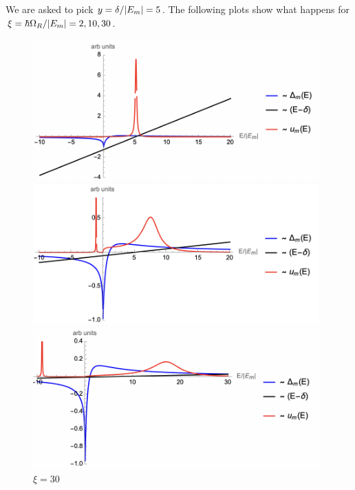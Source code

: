 \documentclass{article}
\theoremstyle{definition}
\begin{document}
\begin{enumerate}[label=(\alph*)]
We are asked to pick $y = \delta / \abs{E_m} = 5$. The following plots show what happens for $\xi = \hbar \Omega_R / \abs{E_m} = 2, 10, 30$. 

\begin{figure}[!htb]
\centering
\begin{minipage}{0.32\textwidth}
\includegraphics[width=0.98\textwidth]{new_2.png}
\caption{$\xi = 2$}
\end{minipage}
\begin{minipage}{0.32\textwidth}
\includegraphics[width=0.98\textwidth]{new_10.png}
\caption{$\xi = 10$}
\end{minipage}
\begin{minipage}{0.32\textwidth}
\includegraphics[width=0.98\textwidth]{new_30.png}
\caption{$\xi = 30$}
\end{minipage}
\end{figure}





\end{enumerate}
\end{document}
